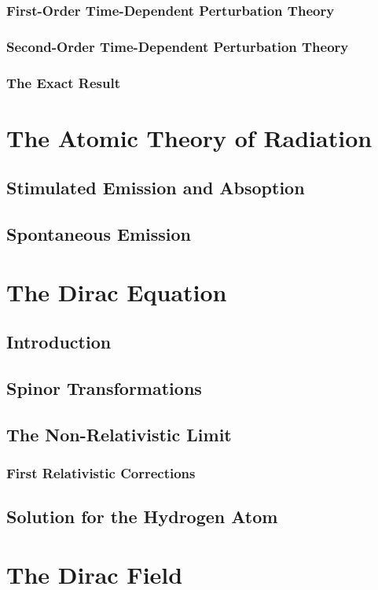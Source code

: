 \documentclass[12pt]{extarticle}
\theoremstyle{definition}
\begin{document}
\subsubsection{First-Order Time-Dependent Perturbation Theory}

\subsubsection{Second-Order Time-Dependent Perturbation Theory}

\subsubsection{The Exact Result}

\section{The Atomic Theory of Radiation}

\subsection{Stimulated Emission and Absoption}

\subsection{Spontaneous Emission}

\section{The Dirac Equation}

\subsection{Introduction}

\subsection{Spinor Transformations}

\subsection{The Non-Relativistic Limit}

\subsubsection{First Relativistic Corrections}

\subsection{Solution for the Hydrogen Atom}

\section{The Dirac Field}
\end{document}
